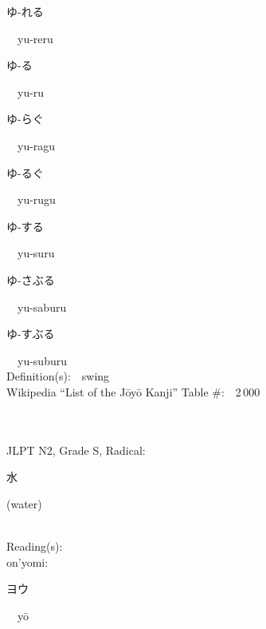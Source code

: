 \begin{multicols}{2}
{\hspace*{2em}}{\begin{CJK}{UTF8}{min} ゆ-れる \end{CJK}}\ \ yu-reru\ \ \\
{\hspace*{2em}}{\begin{CJK}{UTF8}{min} ゆ-る \end{CJK}}\ \ yu-ru\ \ \\
{\hspace*{2em}}{\begin{CJK}{UTF8}{min} ゆ-らぐ \end{CJK}}\ \ yu-ragu\ \ \\
{\hspace*{2em}}{\begin{CJK}{UTF8}{min} ゆ-るぐ \end{CJK}}\ \ yu-rugu\ \ \\
{\hspace*{2em}}{\begin{CJK}{UTF8}{min} ゆ-する \end{CJK}}\ \ yu-suru\ \ \\
{\hspace*{2em}}{\begin{CJK}{UTF8}{min} ゆ-さぶる \end{CJK}}\ \ yu-saburu\ \ \\
{\hspace*{2em}}{\begin{CJK}{UTF8}{min} ゆ-すぶる \end{CJK}}\ \ yu-suburu\ \ \\
Definition(s):\ \ swing \\
Wikipedia ``List of the J\=oy\=o Kanji'' Table \#:\ \ 2\,000 \\
\ \ \\
{\fontsize{34pt}{40pt}  }\ \ \\  %
{JLPT N2, Grade S, Radical:\ \ {\begin{CJK}{UTF8}{min} 水 \end{CJK}} (water) } \\
Reading(s):\ \ \\
{\hspace*{1em}}on'yomi:\ \ \\
{\hspace*{2em}}{\begin{CJK}{UTF8}{min} ヨウ \end{CJK}}\ \ y\=o\ \ \\

\end{multicols}
